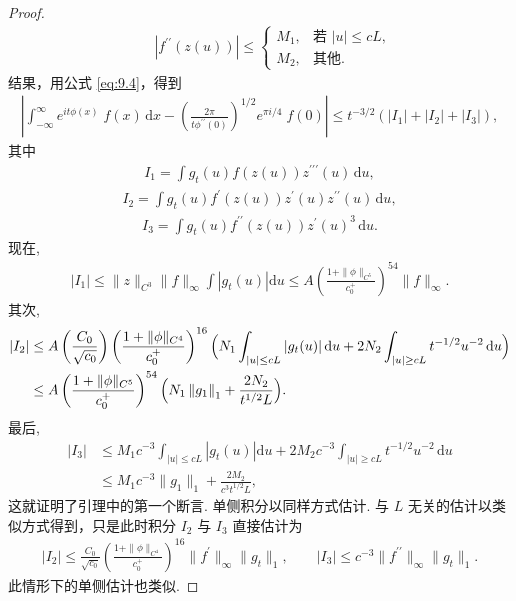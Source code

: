 \begin{proof}
\begin{align*}
  \qquad
  \left|f^{\prime\prime}(z(u))\right|\leq\begin{cases}
    M_{1}, & \text{若 } \left|u\right|\leq cL,\\
    M_{2}, & \text{其他}.
  \end{cases}
\end{align*}
结果，用公式 \eqref{eq:9.4}，得到
\begin{align*}
  \left|\int_{-\infty}^{\infty}e^{i t\phi(x)}\;f(x)\,\mathrm{d}x
  -\left(\frac{2\pi}{t\phi^{\prime\prime}(0)}\right)^{1/2}e^{\pi i/4}\;f(0)\right|
  \leq t^{-3/2}\left(\left|I_{1}\right|+\left|I_{2}\right|+\left|I_{3}\right|\right),
\end{align*}
其中
\begin{align*}
  I_{1}=\int g_{t}(u)f(z(u))z^{\prime\prime\prime}(u)\,\mathrm{d}u,
\end{align*}
\begin{align*}
  I_{2}=\int g_{t}(u)f^{\prime}(z(u))z^{\prime}(u)z^{\prime\prime}(u)\,\mathrm{d}u,
\end{align*}
\begin{align*}
  I_{3}=\int g_{t}(u)f^{\prime\prime}(z(u))z^{\prime}(u)^{3}\,\mathrm{d}u.
\end{align*}
现在,
\begin{align*}
  \left|I_{1}\right|\leq\|z\|_{C^{3}}\|f\|_{\infty}\int\left|g_{t}(u)\right|\mathrm{d}u
  \leq A\left(\frac{1+\|\phi\|_{C^{5}}}{c_{0}^{+}}\right)^{54}\|f\|_{\infty}.
\end{align*}
其次,
\begin{align*}
  \left|I_{2}\right|
  &\leq A\left(\frac{C_{0}}{\sqrt{c_{0}}}\right)\left(\frac{1+\|\phi\|_{C^{4}}}{c_{0}^{+}}\right)^{16}
   \Bigl(N_{1}\int_{|u|\leq cL}\left|g_{t}(u)\right|\mathrm{d}u
   +2N_{2}\int_{|u|\geq cL}t^{-1/2}u^{-2}\,\mathrm{d}u\Bigr)\\
  &\leq A\left(\frac{1+\|\phi\|_{C^{5}}}{c_{0}^{+}}\right)^{54}
   \Bigl(N_{1}\left\|g_{1}\right\|_{1}+\frac{2N_{2}}{t^{1/2}L}\Bigr).
\end{align*}
最后,
\begin{align*}
  \left|I_{3}\right|
  &\leq M_{1}c^{-3}\int_{\left|u\right|\leq cL}\left|g_{t}(u)\right|\mathrm{d}u
   +2M_{2}c^{-3}\int_{\left|u\right|\geq cL}t^{-1/2}u^{-2}\,\mathrm{d}u\\
  &\leq M_{1}c^{-3}\|g_{1}\|_{1}+\frac{2M_{2}}{c^{3}t^{1/2}L},
\end{align*}
这就证明了引理中的第一个断言. 单侧积分以同样方式估计. 与 $L$ 无关的估计以类似方式得到，只是此时积分 $I_{2}$ 与 $I_{3}$ 直接估计为
\begin{align*}
  |I_{2}|\leq\frac{C_{0}}{\sqrt{c_{0}}}\left(\frac{1+\|\phi\|_{C^{4}}}{c_{0}^{+}}\right)^{16}\|f^{\prime}\|_{\infty}\|g_{t}\|_{1},
  \qquad
  |I_{3}|\leq c^{-3}\|f^{\prime\prime}\|_{\infty}\|g_{t}\|_{1}.
\end{align*}
此情形下的单侧估计也类似.
\end{proof}

